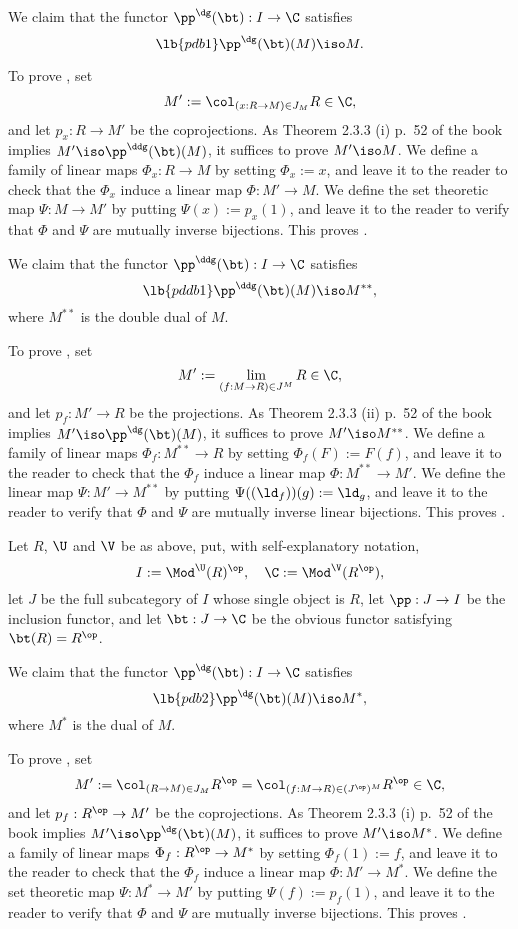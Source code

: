 \documentclass[12pt]{article}
\theoremstyle{remark}
\theoremstyle{definition}
\begin{document}
We claim that the functor $\pp^\dg(\bt):I\to\C$ satisfies 
%
\begin{equation}\lb{pdb1}
\pp^\dg(\bt)(M)\iso M.
\end{equation} 

To prove , set 
$$
M':=\col_{(x:R\to M)\in J_M}R\in\C, 
$$ 
and let $p_x:R\to M'$ be the coprojections. As Theorem 2.3.3 (i) p.~52 of the book implies $M'\iso\pp^\ddg(\bt)(M)$, it suffices to prove $M'\iso M$. We define a family of linear maps $\Phi_x:R\to M$ by setting $\Phi_x:=x$, and leave it to the reader to check that the $\Phi_x$ induce a linear map $\Phi:M'\to M$. We define the set theoretic map $\Psi:M\to M'$ by putting $\Psi(x):=p_x(1)$, and leave it to the reader to verify that $\Phi$ and $\Psi$ are mutually inverse bijections. This proves . 

We claim that the functor $\pp^\ddg(\bt):I\to\C$ satisfies 
%
\begin{equation}\lb{pddb1}
\pp^\ddg(\bt)(M)\iso M^{**}, 
\end{equation} 
%
where $M^{**}$ is the double dual of $M$. 

To prove , set 
$$
M':=\lim_{(f:M\to R)\in J^M}R\in\C, 
$$ 
and let $p_f:M'\to R$ be the projections. As Theorem 2.3.3 (ii) p.~52 of the book implies $M'\iso\pp^\dg(\bt)(M)$, it suffices to prove $M'\iso M^{**}$. We define a family of linear maps $\Phi_f:M^{**}\to R$ by setting $\Phi_f(F):=F(f)$, and leave it to the reader to check that the $\Phi_f$ induce a linear map $\Phi:M^{**}\to M'$. We define the linear map $\Psi:M'\to M^{**}$ by putting $\Psi((\ld_f))(g):=\ld_g$, and leave it to the reader to verify that $\Phi$ and $\Psi$ are mutually inverse linear bijections. This proves . 

Let $R$, $\U$ and $\V$ be as above, put, with self-explanatory notation, 
$$
I:=\Mod^\U(R)^{\op},\quad\C:=\Mod^\V(R^{\op}),
$$ 
let $J$ be the full subcategory of $I$ whose single object is $R$, let $\pp:J\to I$ be the inclusion functor, and let $\bt:J\to\C$ be the obvious functor satisfying $\bt(R)=R^{\op}$. 

We claim that the functor $\pp^\dg(\bt):I\to\C$ satisfies 
%
\begin{equation}\lb{pdb2}
\pp^\dg(\bt)(M)\iso M^*,
\end{equation} 
%
where $M^*$ is the dual of $M$. 

To prove , set 
$$
M':=\col_{(R\to M)\in J_M}R^{\op}=\col_{(f:M\to R)\in(J^{\op})^M}R^{\op}\in\C, 
$$ 
and let $p_f:R^{\op}\to M'$ be the coprojections. As Theorem 2.3.3 (i) p.~52 of the book implies $M'\iso\pp^\dg(\bt)(M)$, it suffices to prove $M'\iso M^*$. We define a family of linear maps $\Phi_f:R^{\op}\to M^*$ by setting $\Phi_f(1):=f$, and leave it to the reader to check that the $\Phi_f$ induce a linear map $\Phi:M'\to M^*$. We define the set theoretic map $\Psi:M^*\to M'$ by putting $\Psi(f):=p_f(1)$, and leave it to the reader to verify that $\Phi$ and $\Psi$ are mutually inverse bijections. This proves . 
\end{document}
